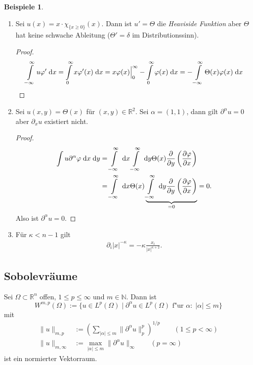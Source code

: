 \documentclass[
paper=a4,
bibtotocnumbered,
liststotocnumbered,
tablecaptionabove,
pointlessnumbers,
twoside,
openright,
10pt
]
{report}
\let\phi\varphi
\theoremstyle{definition}
\newtheorem*{bspe}{Beispiele}
\numberwithin{equation}{chapter}
\begin{document}
\begin{bspe}
\begin{enumerate}[\bf 1)]
\item Sei $u(x)=x\cdot \chi_{\{x\geq 0\}}(x)$. Dann ist $u'=\Theta$ die \textit{Heaviside Funktion} aber $\Theta$ hat keine schwache Ableitung ($\Theta '=\delta$ im Distributionssinn).
\begin{proof}
\begin{align}
\int\limits_{-\infty}^\infty u\phi' \d x=\int\limits_0^\infty x\phi'(x)\d x= x\phi(x)\Big|_0^\infty -\int\limits_0^\infty \phi(x)\d x =-\int\limits_{-\infty}^\infty \Theta(x)\phi(x)\d x
\end{align}
\end{proof}
\item Sei $u(x,y)=\Theta(x)$ für $(x,y)\in\mathbb{R}^2$. Sei $\alpha=(1,1)$, dann gilt $\partial^\alpha u=0$ aber $\partial_x u$ existiert nicht.
\begin{proof}
\begin{align}
\int u\partial^\alpha \phi \d x\d y 
&= \int\limits_{-\infty}^\infty\d x \int\limits_{-\infty}^\infty\d y\Theta(x) \frac{\partial}{\partial y}\left(\frac{\partial\phi}{\partial x}\right)\\
&= \int\limits_{-\infty}^\infty \d x\Theta(x) \underbrace{\int\limits_{-\infty}^\infty\d y \frac{\partial}{\partial y}\left(\frac{\partial\phi}{\partial x}\right)}_{=0} =0.
\end{align}
Also ist $\partial^\alpha u =0$.
\end{proof}
\item Für $\kappa<n-1$ gilt
\begin{align}
\partial_i |x|^{-\kappa} =-\kappa \frac{x_i}{|x|^{\kappa +2}}.
\end{align}
\end{enumerate}
\end{bspe}

\subsection{Sobolevräume}
Sei $\Omega\subset\mathbb{R}^n$ offen, $1\leq p\leq\infty$ und $m\in\mathbb{N}$. Dann ist
\begin{equation}
W^{m,p}(\Omega):=\{u\in L^p(\Omega)\mid \partial^\alpha u\in L^p(\Omega)\text{ f"ur }\alpha:\;|\alpha|\leq m\}
\end{equation}
mit
\begin{align}
\|u\|_{m,p}&:=\left(\sum\limits_{|\alpha|\leq m}\|\partial^\alpha u\|_p^p\right)^{1/p}\qquad (1\leq p<\infty) \\
\|u\|_{m,\infty} &:= \max\limits_{|\alpha|\leq m} \|\partial^\alpha u\|_\infty \qquad (p=\infty)
\end{align}
ist ein normierter Vektorraum.
\end{document}
